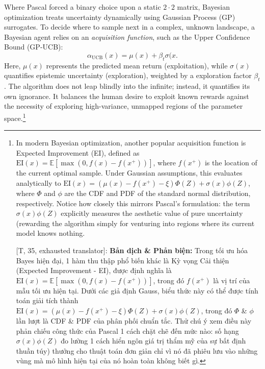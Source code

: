 \documentclass[11pt]{article}
\begin{document}
Where Pascal forced a binary choice upon a static $2 \cdot 2$ matrix, Bayesian optimization treats uncertainty dynamically using Gaussian Process (GP) surrogates. To decide where to sample next in a complex, unknown landscape, a Bayesian agent relies on an \emph{acquisition function}, such as the Upper Confidence Bound (GP-UCB):
\begin{equation*}
	\alpha_{\text{UCB}}(x) = \mu(x) + \beta_t \sigma(x.
\end{equation*}
Here, $\mu(x)$ represents the predicted mean return (exploitation), while $\sigma(x)$ quantifies epistemic uncertainty (exploration), weighted by a exploration factor $\beta_t$. The algorithm does not leap blindly into the infinite; instead, it quantifies its own ignorance. It balances the human desire to exploit known rewards against the necessity of exploring high-variance, unmapped regions of the parameter space.\footnote{In modern Bayesian optimization, another popular acquisition function is Expected Improvement (EI), defined as $\text{EI}(x) = \mathbb{E}[\max(0, f(x) - f(x^+))]$, where $f(x^+)$ is the location of the current optimal sample. Under Gaussian assumptions, this evaluates analytically to $\text{EI}(x) = (\mu(x) - f(x^+) - \xi)\Phi(Z) + \sigma(x)\phi(Z)$, where $\Phi$ and $\phi$ are the CDF and PDF of the standard normal distribution, respectively. Notice how closely this mirrors Pascal's formulation: the term $\sigma(x)\phi(Z)$ explicitly measures the aesthetic value of pure uncertainty (rewarding the algorithm simply for venturing into regions where its current model knows nothing.
	
	\textsf{[T, 35, exhausted translator]:} \textbf{Bản dịch \& Phản biện:} Trong tối ưu hóa Bayes hiện đại, 1 hàm thu thập phổ biến khác là Kỳ vọng Cải thiện (Expected Improvement - EI), được định nghĩa là $\text{EI}(x) = \mathbb{E}[\max(0, f(x) - f(x^+))]$, trong đó $f(x^+)$ là vị trí của mẫu tối ưu hiện tại. Dưới các giả định Gauss, biểu thức này có thể được tính toán giải tích thành $\text{EI}(x) = (\mu(x) - f(x^+) - \xi)\Phi(Z) + \sigma(x)\phi(Z)$, trong đó $\Phi$ \& $\phi$ lần lượt là CDF \& PDF của phân phối chuẩn tắc. Thử chú ý xem điều này phản chiếu công thức của Pascal 1 cách chặt chẽ đến mức nào: số hạng $\sigma(x)\phi(Z)$ đo lường 1 cách hiển ngôn giá trị thẩm mỹ của sự bất định thuần túy) thưởng cho thuật toán đơn giản chỉ vì nó đã phiêu lưu vào những vùng mà mô hình hiện tại của nó hoàn toàn không biết gì.}
\end{document}
